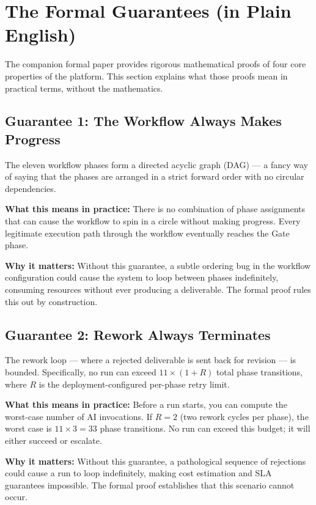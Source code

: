 \documentclass[12pt]{article}
\begin{document}
\section{The Formal Guarantees (in Plain English)}
\label{sec:guarantees}

The companion formal paper provides rigorous mathematical proofs of
four core properties of the platform.
This section explains what those proofs mean in practical terms,
without the mathematics.

\subsection{Guarantee 1: The Workflow Always Makes Progress}

The eleven workflow phases form a directed acyclic graph (DAG) ---
a fancy way of saying that the phases are arranged in a strict
forward order with no circular dependencies.

\medskip
\noindent\textbf{What this means in practice:}
There is no combination of phase assignments that can cause the
workflow to spin in a circle without making progress.
Every legitimate execution path through the workflow eventually
reaches the Gate phase.

\medskip
\noindent\textbf{Why it matters:}
Without this guarantee, a subtle ordering bug in the workflow
configuration could cause the system to loop between phases
indefinitely, consuming resources without ever producing a
deliverable.
The formal proof rules this out by construction.

\subsection{Guarantee 2: Rework Always Terminates}

The rework loop --- where a rejected deliverable is sent back for
revision --- is bounded.
Specifically, no run can exceed $11 \times (1 + R)$ total phase
transitions, where $R$ is the deployment-configured per-phase retry
limit.

\medskip
\noindent\textbf{What this means in practice:}
Before a run starts, you can compute the worst-case number of
AI invocations.
If $R = 2$ (two rework cycles per phase), the worst case is
$11 \times 3 = 33$ phase transitions.
No run can exceed this budget; it will either succeed or escalate.

\medskip
\noindent\textbf{Why it matters:}
Without this guarantee, a pathological sequence of rejections could
cause a run to loop indefinitely, making cost estimation and SLA
guarantees impossible.
The formal proof establishes that this scenario cannot occur.
\end{document}

